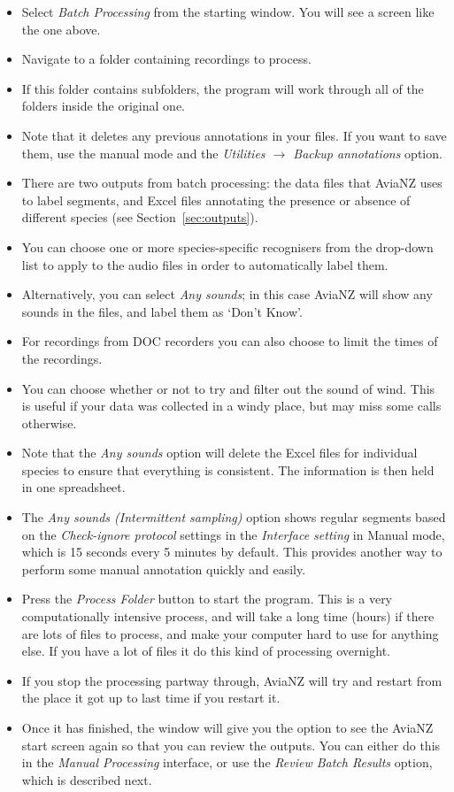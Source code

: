 \documentclass{scrartcl}
\begin{document}
\begin{itemize}
	\item Select \textit{Batch Processing} from the starting window. You will see a screen like the one above. 
\item Navigate to a folder containing recordings to process. 
\item If this folder contains subfolders, the program will work through all of the folders inside the original one. 
\item Note that it deletes any previous annotations in your files. If you want to save them, use the manual mode and the \textit{Utilities $\rightarrow$ Backup annotations} option.
\item There are two outputs from batch processing: the data files that AviaNZ uses to label segments, and Excel files annotating the presence or absence of different species (see Section~\ref{sec:outputs}).
\item You can choose one or more species-specific recognisers from the drop-down list to apply to the audio files in order to automatically label them. 
\item Alternatively, you can select \textit{Any sounds}; in this case AviaNZ will show any sounds in the files, and label them as `Don't Know'. 
\item For recordings from DOC recorders you can also choose to limit the times of the recordings. 
\item You can choose whether or not to try and filter out the sound of wind. This is useful if your data was collected in a windy place, but may miss some calls otherwise. 
\item Note that the \textit{Any sounds} option will delete the Excel files for individual species to ensure that everything is consistent. The information is then held in one spreadsheet.  
\item The \textit{Any sounds (Intermittent sampling)} option shows regular segments based on the \textit{Check-ignore protocol} settings in the \textit{Interface setting} in Manual mode, which is 15 seconds every 5 minutes by default. This provides another way to perform some manual annotation quickly and easily.
\item Press the \textit{Process Folder} button to start the program. This is a very computationally intensive process, and will take a long time (hours) if there are lots of files to process, and make your computer hard to use for anything else. If you have a lot of files it do this kind of processing overnight. 
\item If you stop the processing partway through, AviaNZ will try and restart from the place it got up to last time if you restart it.
\item Once it has finished, the window will give you the option to see the AviaNZ start screen again so that you can review the outputs. You can either do this in the \textit{Manual Processing} interface, or use the \textit{Review Batch Results} option, which is described next. 
\end{itemize}
\end{document}
